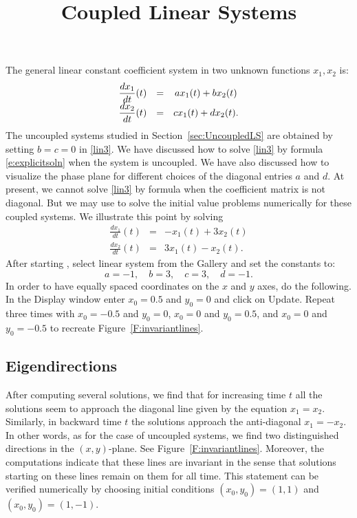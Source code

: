 \documentclass{ximera}
\title{Coupled Linear Systems}
\begin{document}
\begin{abstract}
\end{abstract}
\maketitle

 \label{s:3.5}


The general linear constant coefficient system in two unknown functions 
$x_1,x_2$ is:
\renewcommand{\arraystretch}{1.8}
\begin{equation}\label{lin3}
\begin{array}{ccc}
\displaystyle \frac{dx_1}{dt}(t) & = & ax_1(t) + bx_2(t) \\
\displaystyle \frac{dx_2}{dt}(t) & = & cx_1(t) + dx_2(t).
\end{array}
\end{equation}
\renewcommand{\arraystretch}{1.0}%
The uncoupled systems studied in Section~\ref{sec:UncoupledLS} are obtained 
by setting $b=c=0$ in \eqref{lin3}.  We have discussed how to solve \eqref{lin3} 
by formula \eqref{e:explicitsoln} when the system is uncoupled.  We have also 
discussed how to visualize the phase plane for different choices of the 
diagonal entries $a$ and $d$.  At present, we cannot
solve \eqref{lin3} by formula when the coefficient matrix is not diagonal.
But we may use {\pplane} to solve the initial value problems numerically 
for these coupled systems.  We illustrate this point by solving
\begin{eqnarray*}
\frac{dx_1}{dt}(t) & = &  -x_1(t) + 3x_2(t) \\
\frac{dx_2}{dt}(t) & = &  3x_1(t) - x_2(t).
\end{eqnarray*}
After starting {\pplane}, select {\sf linear system} from the
{\sf Gallery} and set the constants to:
\[
	a = -1,\quad b = 3,\quad c = 3, \quad d = -1.
\]
In order to have equally spaced coordinates on
the $x$ and $y$ axes, do the following.   In the \pplane\; {\sf Display} 
window enter $x_0 = 0.5$ and $y_0 = 0$ and click on {\sf Update}.
Repeat three times with $x_0 = -0.5$ and $y_0 = 0$, $x_0 = 0$ and $y_0 = 0.5$, 
and $x_0 = 0$ and $y_0 = -0.5$ to recreate Figure~\ref{F:invariantlines}.

\subsection*{Eigendirections}

After computing several solutions, we find that for increasing
time $t$ all the solutions seem to approach the diagonal line
given by the equation $x_1=x_2$. Similarly, in backward time $t$
the solutions approach the anti-diagonal $x_1=-x_2$.  In other
words, as for the case of uncoupled systems, we find two
distinguished directions in the $(x,y)$-plane.  See
Figure~\ref{F:invariantlines}.  Moreover, the computations
indicate that these lines are invariant in the sense that
solutions starting on these lines remain on them for all time.
This statement can be verified numerically by choosing initial
conditions $(x_0,y_0)=(1,1)$ and $(x_0,y_0)=(1,-1)$.
\end{document}
